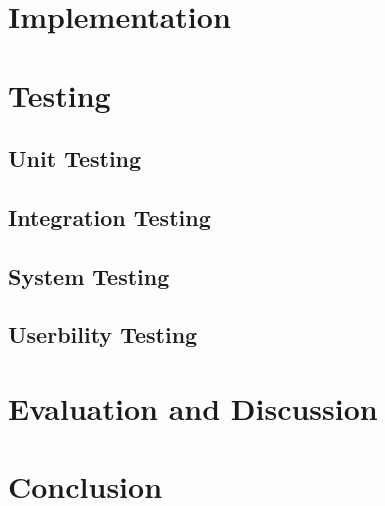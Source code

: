 \documentclass[11pt]{article}
\begin{document}
%

\section{Implementation}

\section{Testing}

\subsection{Unit Testing}

\subsection{Integration Testing}

\subsection{System Testing}

\subsection{Userbility Testing}


\section{Evaluation and Discussion}

\section{Conclusion}


%
 
\end{document}
